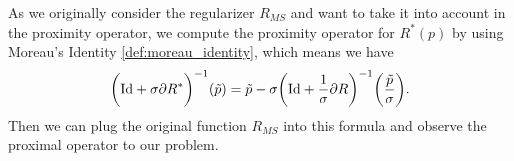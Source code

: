         As we originally consider the regularizer $R_{MS}$ and want to take it into account in the proximity operator, we compute the proximity operator for $R^{\ast}(p)$ by using Moreau's Identity \ref{def:moreau_identity}, which means we have
            \begin{equation}
                \bigg( \textnormal{Id} + \sigma \partial R^{\ast} \bigg)^{-1}(\tilde{p}) = \tilde{p} - \sigma \bigg( \textnormal{Id} + \frac{1}{\sigma} \partial R \bigg)^{-1} \bigg(\frac{\tilde{p}}{\sigma} \bigg).
            \label{eq:moreau_mumford_shah_regularizer}
            \end{equation}
        Then we can plug the original function $R_{MS}$ into this formula and observe the proximal operator to our problem.


